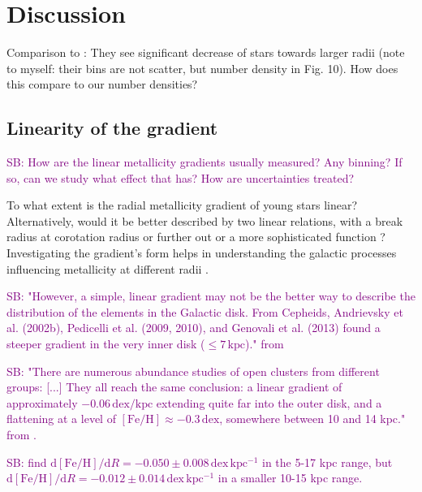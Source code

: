 \documentclass[fleqn,usenatbib]{mnras}
\newcommand{\SB}[1]{{\textcolor{purple}{SB: #1}}}
\begin{document}
\section{Discussion} \label{sec:discussion}

Comparison to \citet[][see their Fig. 10]{Minchev2014b}: They see significant decrease of stars towards larger radii (note to myself: their bins are not scatter, but number density in Fig. 10). How does this compare to our number densities?

\subsection{Linearity of the gradient} \label{sec:discussion_linearity}

\SB{How are the linear metallicity gradients usually measured? Any binning? If so, can we study what effect that has? How are uncertainties treated?}

To what extent is the radial metallicity gradient of young stars linear? Alternatively, would it be better described by two linear relations, with a break radius at corotation radius \citep[][and references therein]{Bresolin2012} or further out \citep{Donor2020} or a more sophisticated function \citep[see e.g.][]{Chiappini2001, Kubryk2015}? Investigating the gradient's form helps in understanding the galactic processes influencing metallicity at different radii \citep{Minchev2014b}.

\SB{"However, a simple, linear gradient may not be the better way to describe the distribution of the elements in the Galactic disk. From Cepheids, Andrievsky et al. (2002b), Pedicelli et al. (2009, 2010), and Genovali et al. (2013) found a steeper gradient in the very inner disk ($\leq 7\,\mathrm{kpc}$)." from \citet{Lemasle2013}}

\SB{"There are numerous abundance studies of open clusters from different groups: [...] They all reach the same conclusion: a linear gradient of approximately $-0.06\,\mathrm{dex/kpc}$ extending quite far into the outer disk, and a flattening at a level of $\mathrm{[Fe/H]} \approx -0.3\,\mathrm{dex}$, somewhere between 10 and 14 kpc." from \citet{Lemasle2013}.}

\SB{\citet{Lemasle2008} find $\mathrm{d[Fe/H]}/\mathrm{d}R = -0.050 \pm 0.008\,\mathrm{dex\,kpc^{-1}}$ in the 5-17 kpc range, but $\mathrm{d[Fe/H]}/\mathrm{d}R = -0.012 \pm 0.014\,\mathrm{dex\,kpc^{-1}}$ in a smaller 10-15 kpc range.}
\end{document}
